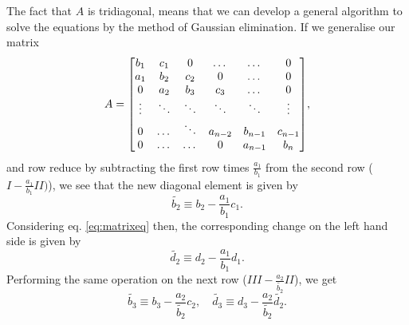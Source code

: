 The fact that $A$ is tridiagonal, means that we can develop a general algorithm
to solve the equations by the method of Gaussian elimination. If we generalise
our matrix
  \[A =
    \mqty[b_1 & c_1 & 0 & \dots & \dots & 0 \\
          a_1 & b_2 & c_2 & 0 & \dots & 0 \\
          0 & a_2 & b_3 & c_3 & \dots & 0 \\
          \vdots & \ddots & \ddots & \ddots & \ddots & \vdots \\
          0 & \dots & \ddots & a_{n-2} & b_{n-1} & c_{n-1} \\
          0 & \dots & \dots & 0 & a_{n-1} & b_n],
  \]
and row reduce by subtracting the first row times $\frac{a_1}{b_1}$ from the
second row ($I - \frac{a_1}{b_1}II)$), we see that the new diagonal element is
given by
  \[\widetilde{b_2} \equiv b_2 - \frac{a_1}{b_1}c_1.\]
Considering eq. \ref{eq:matrixeq} then, the corresponding change on the left
hand side is given by
  \[\widetilde{d_2} \equiv d_2 - \frac{a_1}{b_1}d_1.\]
Performing the same operation on the next row
($III - \frac{a_2}{\widetilde{b_2}}II$), we get
  \[\widetilde{b_3} \equiv b_3 - \frac{a_2}{\widetilde{b_2}}c_2, \quad
  \widetilde{d_3} \equiv d_3 - \frac{a_2}{\widetilde{b_2}}\widetilde{d_2}.
  \]
